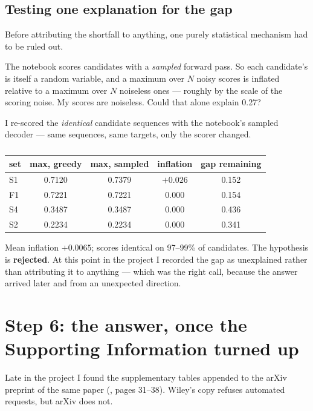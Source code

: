 \subsection{Testing one explanation for the gap}
\label{sec:stochasticity}

Before attributing the shortfall to anything, one purely statistical mechanism
had to be ruled out.

The notebook scores candidates with a \emph{sampled} forward pass. So each
candidate's \Rsq{} is itself a random variable, and a maximum over $N$ noisy
scores is inflated relative to a maximum over $N$ noiseless ones --- roughly by
the scale of the scoring noise. My scores are noiseless. Could that alone
explain 0.27?

I re-scored the \emph{identical} candidate sequences with the notebook's
sampled decoder --- same sequences, same targets, only the scorer changed.

\begin{table}[htbp]
\centering\small
\caption[Scoring stochasticity]{}
\begin{tabular}{lcccc}
\toprule
\textbf{set} & \textbf{max, greedy} & \textbf{max, sampled} & \textbf{inflation} & \textbf{gap remaining} \\
\midrule
S1 & 0.7120 & 0.7379 & $+0.026$ & 0.152 \\
F1 & 0.7221 & 0.7221 & $0.000$ & 0.154 \\
S4 & 0.3487 & 0.3487 & $0.000$ & 0.436 \\
S2 & 0.2234 & 0.2234 & $0.000$ & 0.341 \\
\bottomrule
\end{tabular}
\end{table}

Mean inflation $+0.0065$; scores identical on 97--99\% of candidates. The
hypothesis is \textbf{rejected}. At this point in the project I recorded the gap
as unexplained rather than attributing it to anything --- which was the right
call, because the answer arrived later and from an unexpected direction.

\section{Step 6: the answer, once the Supporting Information turned up}
\label{sec:exactmatch}

Late in the project I found the supplementary tables appended to the arXiv
preprint of the same paper (, pages 31--38). Wiley's copy
refuses automated requests, but arXiv does not.

